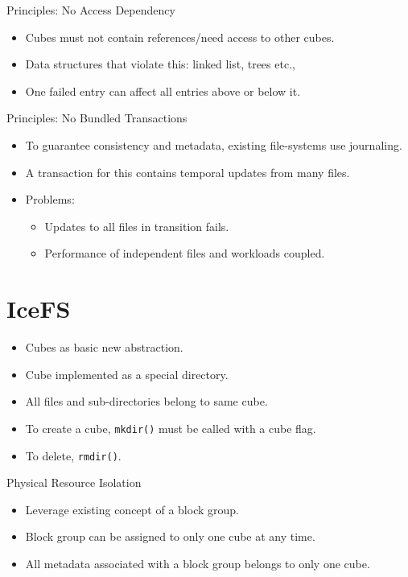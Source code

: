 \documentclass[aspectratio=169]{beamer}
\newcommand{\bi}{\begin{itemize}}
\newcommand{\ei}{\end{itemize}}
\newcommand{\bn}{\begin{enumerate}}
\newcommand{\en}{\end{enumerate}}
\begin{document}
\begin{frame}{Principles: No Access Dependency}
    \bi
\item Cubes must not contain references/need access to other cubes.
\item Data structures that violate this: linked list, trees etc.,
\item One failed entry can affect all entries above or below it.
    \ei
\end{frame}

\begin{frame}{Principles: No Bundled Transactions}
    \bi
\item To guarantee consistency and metadata, existing file-systems use
    journaling.
\item A transaction for this contains temporal updates from many files.
\item Problems:
    \bi
\item Updates to all files in transition fails.
\item Performance of independent files and workloads coupled.
    \ei
    \ei
\end{frame}

\section{IceFS}
\begin{frame}
    \bi
\item Cubes as basic new abstraction.
\item Cube implemented as a special directory.
\item All files and sub-directories belong to same cube.
\item To create a cube, \texttt{mkdir()} must be called with a cube flag.
\item To delete, \texttt{rmdir()}.
    \ei
\end{frame}

\begin{frame}{Physical Resource Isolation}
    \bi
\item Leverage existing concept of a block group.
\item Block group can be assigned to only one cube at any time.
\item All metadata associated with a block group belongs to only one cube.
    \ei
\end{frame}
\end{document}
